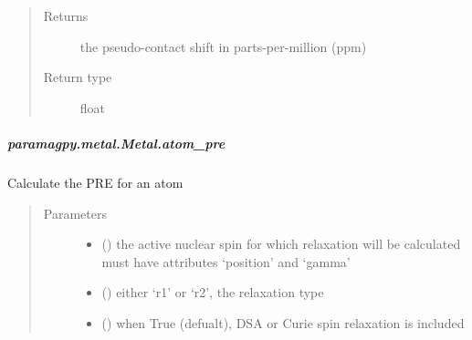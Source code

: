 \documentclass[a4paper,10pt,english]{sphinxmanual}
\begin{document}
\begin{fulllineitems}
\begin{fulllineitems}
\begin{fulllineitems}
\begin{quote}
\begin{description}
\item[{Returns}] \leavevmode
{} \textendash{} the pseudo-contact shift in parts-per-million (ppm)

\item[{Return type}] \leavevmode
float

\end{description}\end{quote}

\end{fulllineitems}



\subparagraph{paramagpy.metal.Metal.atom\_pre}
\label{\detokenize{reference/generated/paramagpy.metal.Metal.atom_pre:paramagpy-metal-metal-atom-pre}}\label{\detokenize{reference/generated/paramagpy.metal.Metal.atom_pre::doc}}

\begin{fulllineitems}
\label{\detokenize{reference/generated/paramagpy.metal.Metal.atom_pre:paramagpy.metal.Metal.atom_pre}}
Calculate the PRE for an atom
\begin{quote}\begin{description}
\item[{Parameters}] \leavevmode\begin{itemize}
\item {} 
 ({\hyperref[\detokenize{reference/generated/paramagpy.protein.CustomAtom:paramagpy.protein.CustomAtom}]{}}) \textendash{} the active nuclear spin for which relaxation will be calculated
must have attributes ‘position’ and ‘gamma’

\item {} 
 () \textendash{} either ‘r1’ or ‘r2’, the relaxation type

\item {} 
 (\sphinxstyleliteralemphasis{\sphinxupquote{ (}}\sphinxstyleliteralemphasis{\sphinxupquote{)}}) \textendash{} when True (defualt), DSA or Curie spin relaxation is included


\end{itemize}
\end{description}
\end{quote}
\end{fulllineitems}
\end{fulllineitems}
\end{fulllineitems}
\end{document}
